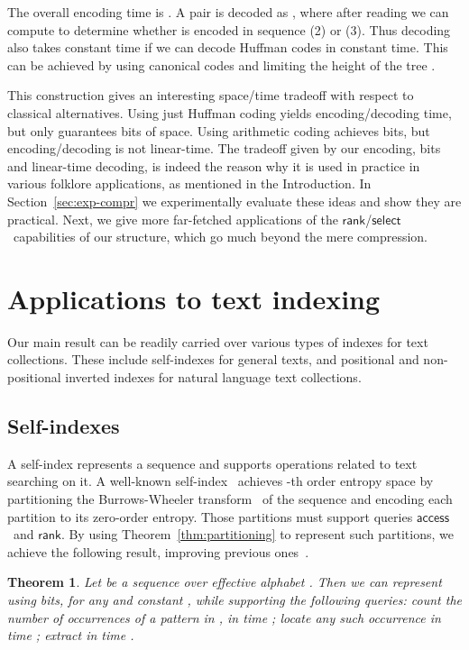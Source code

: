 \documentclass[11pt]{article}
\newtheorem{theorem}{Theorem}
\newcommand{\access}
    {\ensuremath{\mathsf{access}}}
\newcommand{\rank}
    {\ensuremath{\mathsf{rank}}}
\newcommand{\select}
    {\ensuremath{\mathsf{select}}}
\begin{document}
\begin{table}[t]
{\begin{tabular}
The overall encoding time is . A pair  is 
decoded as , where after reading  we can
compute  to determine whether  is encoded in sequence (2) or
(3). Thus decoding also takes constant time if we can decode Huffman codes in
constant time. This can be achieved by using canonical codes and limiting the
height of the tree \cite{MT97,GN09}. 

This construction gives an interesting space/time tradeoff with respect to
classical alternatives. Using just Huffman coding yields 
encoding/decoding time, but only guarantees  bits of space. 
Using arithmetic coding achieves  bits, but encoding/decoding
is not linear-time. The tradeoff given by our encoding,  bits
and linear-time decoding, is indeed the
reason why it is used in practice in various folklore applications, as
mentioned in the Introduction. In Section~\ref{sec:exp-compr} we
experimentally evaluate these ideas and show they are practical. 
Next, we give more far-fetched applications
of the \rank/\select\ capabilities of our structure, which go much beyond
the mere compression.

\section{Applications to text indexing}
\label{sec:app-text}

Our main result can be readily carried over various types of indexes for
text collections. These include self-indexes for general texts, and positional
and non-positional inverted indexes for natural language text collections.

\subsection{Self-indexes}
\label{sec:higher-order}

A self-index represents a sequence and supports
operations related to text searching on it.
A well-known self-index~\cite{FMMN07} achieves -th order entropy space
by partitioning the Burrows-Wheeler transform~\cite{BW94}
of the sequence and encoding
each partition to its zero-order entropy. Those partitions must support
queries \access\ and \rank. By using Theorem~\ref{thm:partitioning} to
represent such partitions, we achieve the following result, improving previous
ones~\cite{FMMN07,GMR06,BHMR07}.

\begin{theorem} \label{thm:self}
  Let  be a sequence over effective alphabet .
Then we can represent  using  bits,
  for any  and constant
  , while supporting the following queries:
 count the number of occurrences of a pattern  in ,
  in time ;
 locate any such occurrence in time ;
 extract  in time .
\end{theorem}


\end{tabular}}
\end{table}
\end{document}
